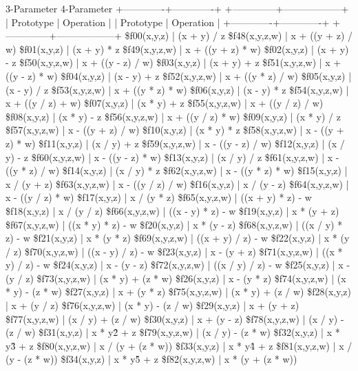 3-Parameter                       4-Parameter
+-------------+-------------+    +--------------+------------------+
|  Prototype  |  Operation  |    |  Prototype   |    Operation     |
+-------------+-------------+    +--------------+------------------+
\$f00(x,y,z) | (x + y) / z       \$f48(x,y,z,w) | x + ((y + z) / w)
\$f01(x,y,z) | (x + y) * z       \$f49(x,y,z,w) | x + ((y + z) * w)
\$f02(x,y,z) | (x + y) - z       \$f50(x,y,z,w) | x + ((y - z) / w)
\$f03(x,y,z) | (x + y) + z       \$f51(x,y,z,w) | x + ((y - z) * w)
\$f04(x,y,z) | (x - y) + z       \$f52(x,y,z,w) | x + ((y * z) / w)
\$f05(x,y,z) | (x - y) / z       \$f53(x,y,z,w) | x + ((y * z) * w)
\$f06(x,y,z) | (x - y) * z       \$f54(x,y,z,w) | x + ((y / z) + w)
\$f07(x,y,z) | (x * y) + z       \$f55(x,y,z,w) | x + ((y / z) / w)
\$f08(x,y,z) | (x * y) - z       \$f56(x,y,z,w) | x + ((y / z) * w)
\$f09(x,y,z) | (x * y) / z       \$f57(x,y,z,w) | x - ((y + z) / w)
\$f10(x,y,z) | (x * y) * z       \$f58(x,y,z,w) | x - ((y + z) * w)
\$f11(x,y,z) | (x / y) + z       \$f59(x,y,z,w) | x - ((y - z) / w)
\$f12(x,y,z) | (x / y) - z       \$f60(x,y,z,w) | x - ((y - z) * w)
\$f13(x,y,z) | (x / y) / z       \$f61(x,y,z,w) | x - ((y * z) / w)
\$f14(x,y,z) | (x / y) * z       \$f62(x,y,z,w) | x - ((y * z) * w)
\$f15(x,y,z) | x / (y + z)       \$f63(x,y,z,w) | x - ((y / z) / w)
\$f16(x,y,z) | x / (y - z)       \$f64(x,y,z,w) | x - ((y / z) * w)
\$f17(x,y,z) | x / (y * z)       \$f65(x,y,z,w) | ((x + y) * z) - w
\$f18(x,y,z) | x / (y / z)       \$f66(x,y,z,w) | ((x - y) * z) - w
\$f19(x,y,z) | x * (y + z)       \$f67(x,y,z,w) | ((x * y) * z) - w
\$f20(x,y,z) | x * (y - z)       \$f68(x,y,z,w) | ((x / y) * z) - w
\$f21(x,y,z) | x * (y * z)       \$f69(x,y,z,w) | ((x + y) / z) - w
\$f22(x,y,z) | x * (y / z)       \$f70(x,y,z,w) | ((x - y) / z) - w
\$f23(x,y,z) | x - (y + z)       \$f71(x,y,z,w) | ((x * y) / z) - w
\$f24(x,y,z) | x - (y - z)       \$f72(x,y,z,w) | ((x / y) / z) - w
\$f25(x,y,z) | x - (y / z)       \$f73(x,y,z,w) | (x * y) + (z * w)
\$f26(x,y,z) | x - (y * z)       \$f74(x,y,z,w) | (x * y) - (z * w)
\$f27(x,y,z) | x + (y * z)       \$f75(x,y,z,w) | (x * y) + (z / w)
\$f28(x,y,z) | x + (y / z)       \$f76(x,y,z,w) | (x * y) - (z / w)
\$f29(x,y,z) | x + (y + z)       \$f77(x,y,z,w) | (x / y) + (z / w)
\$f30(x,y,z) | x + (y - z)       \$f78(x,y,z,w) | (x / y) - (z / w)
\$f31(x,y,z) | x * y\^2 + z       \$f79(x,y,z,w) | (x / y) - (z * w)
\$f32(x,y,z) | x * y\^3 + z       \$f80(x,y,z,w) | x / (y + (z * w))
\$f33(x,y,z) | x * y\^4 + z       \$f81(x,y,z,w) | x / (y - (z * w))
\$f34(x,y,z) | x * y\^5 + z       \$f82(x,y,z,w) | x * (y + (z * w))
